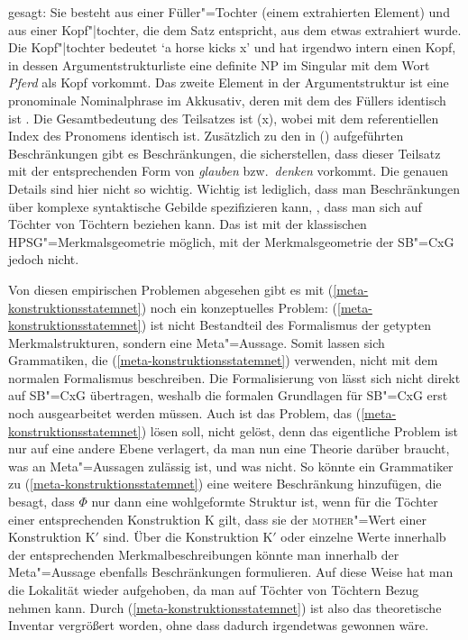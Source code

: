 gesagt: Sie besteht aus einer Füller"=Tochter (einem extrahierten Element) und aus einer
Kopf"|tochter, die dem Satz entspricht, aus dem etwas extrahiert wurde. Die Kopf"|tochter bedeutet
`\textrm{a horse kicks x}' und hat irgendwo intern einen Kopf, in dessen Argumentstrukturliste eine definite
NP im Singular mit dem Wort \emph{Pferd} als Kopf vorkommt. Das zweite Element in der
Argumentstruktur ist eine pronominale Nominalphrase im Akkusativ, deren \localw mit dem des Füllers
identisch ist . Die Gesamtbedeutung des Teilsatzes ist (x),
wobei  mit dem referentiellen Index des Pronomens identisch ist. Zusätzlich zu den in
() aufgeführten Beschränkungen gibt es Beschränkungen, die sicherstellen, dass dieser
Teilsatz mit der entsprechenden Form von \emph{glauben} bzw.\ \emph{denken} vorkommt. Die genauen
Details sind hier nicht so wichtig. Wichtig ist lediglich, dass man Beschränkungen über komplexe
syntaktische Gebilde spezifizieren kann, \dash, dass man sich auf Töchter von Töchtern beziehen
kann. Das ist mit der klassischen HPSG"=Merkmalsgeometrie möglich, mit der Merkmalsgeometrie der
SB"=CxG jedoch nicht. 


Von diesen empirischen Problemen abgesehen gibt es mit (\ref{meta-konstruktionsstatemnet}) noch ein konzeptuelles Problem:
(\ref{meta-konstruktionsstatemnet}) ist nicht Bestandteil des Formalismus der getypten Merkmalstrukturen, sondern eine
Meta"=Aussage. Somit lassen sich Grammatiken, die (\ref{meta-konstruktionsstatemnet}) verwenden, 
nicht mit dem normalen Formalismus beschreiben. Die Formalisierung von \citet{Richter2004a-u} lässt sich
nicht direkt auf SB"=CxG übertragen, weshalb die formalen Grundlagen für SB"=CxG erst noch
ausgearbeitet werden müssen.
Auch ist das Problem, das (\ref{meta-konstruktionsstatemnet}) lösen soll, nicht gelöst, denn
das eigentliche Problem ist nur auf eine andere Ebene verlagert, da man nun eine Theorie
darüber braucht, was an Meta"=Aussagen zulässig ist, und was nicht. So könnte ein Grammatiker zu (\ref{meta-konstruktionsstatemnet})
eine weitere Beschränkung hinzufügen, die besagt, dass $\Phi$ nur dann eine wohlgeformte Struktur
ist, wenn für die Töchter einer entsprechenden Konstruktion K gilt, dass sie der \textsc{mother}"=Wert
einer Konstruktion K$'$ sind. Über die Konstruktion K$'$ oder einzelne Werte innerhalb der entsprechenden
Merkmalbeschreibungen könnte man innerhalb der Meta"=Aussage ebenfalls Beschränkungen formulieren.
Auf diese Weise hat man die Lokalität wieder aufgehoben, da man auf Töchter von Töchtern Bezug nehmen kann.
Durch (\ref{meta-konstruktionsstatemnet}) ist also das theoretische Inventar vergrößert worden,
ohne dass dadurch irgendetwas gewonnen wäre.


